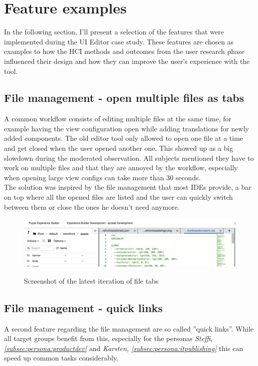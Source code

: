 \section{Feature examples}

In the following section, I'll present a selection of the features that were implemented during the UI Editor case study.
These features are chosen as examples to how the HCI methods and outcomes from the user research phase influenced their design and how they can improve the user's experience with the tool. 

\subsection{File management - open multiple files as tabs}

A common workflow consists of editing multiple files at the same time, for example having the view configuration open while adding translations for newly added components.
The old editor tool only allowed to open one file at a time and get closed when the user opened another one. This showed up as a big slowdown during the moderated observation.
All subjects mentioned they have to work on multiple files and that they are annoyed by the workflow, especially when opening large view configs can take more than 30 seconds.
\\
The solution was inspired by the file management that most IDEs provide, a bar on top where all the opened files are listed and the user can quickly switch between them or close the ones he doesn't need anymore.

\begin{figure}[h]
  \includegraphics[width=\textwidth]{pics/file_tabs.png}
  \label{fig:file-tabs}
  \caption{Screenshot of the latest iteration of file tabs}
\end{figure}

\subsection{File management - quick links}

A second feature regarding the file management are so called ''quick links''. While all target groups benefit from this, especially for the personas \textit{Steffi, \ref{subsec:persona:productdev}} and \textit{Karsten, \ref{subsec:persona:itpublishing}}
this can speed up common tasks considerably.

